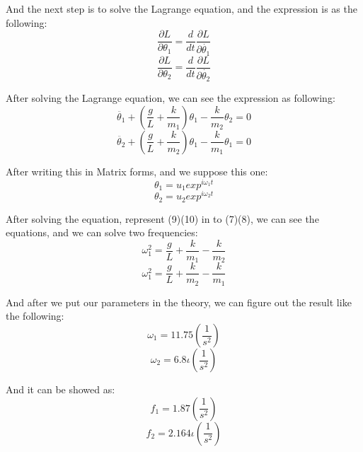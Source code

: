 \documentclass[final,1p,11pt]{elsarticle}
\begin{document}
And the next step is to solve the Lagrange equation, and the expression is as the following:
\begin{equation}
\frac{\partial L}{\partial \theta_1}=\frac{d}{dt}\frac{\partial L}{\partial \dot{\theta_1}}
\end{equation}
\begin{equation}
\frac{\partial L}{\partial \theta_2}=\frac{d}{dt}\frac{\partial L}{\partial \dot{\theta_2}}
\end{equation}

After solving the Lagrange equation, we can see the expression as following:
\begin{equation}
\ddot{\theta_1}+(\frac{g}{L}+\frac{k}{m_1})\theta_1-\frac{k}{m_2}\theta_2=0
\end{equation}
\begin{equation}
\ddot{\theta_2}+(\frac{g}{L}+\frac{k}{m_2})\theta_1-\frac{k}{m_1}\theta_1=0
\end{equation}

After writing this in Matrix forms, and we suppose this one:
\begin{equation}
\theta_1=u_1exp^{i\omega_1t}
\end{equation}
\begin{equation}
\theta_2=u_2exp^{i\omega_2t}
\end{equation}

After solving the equation, represent (9)(10) in to (7)(8), we can see the equations, and we can solve two frequencies:
\begin{equation}
\omega_1^2=\frac{g}{L}+\frac{k}{m_1}-\frac{k}{m_2}
\end{equation}
\begin{equation}
\omega_1^2=\frac{g}{L}+\frac{k}{m_2}-\frac{k}{m_1}
\end{equation}

And after we put our parameters in the theory, we can figure out the result like the following:
\begin{equation}
\omega_1=11.75(\frac{1}{s^2})  
\end{equation}
\begin{equation}
\omega_2=6.8\iota(\frac{1}{s^2})  
\end{equation}

And it can be showed as:
\begin{equation}
f_1=1.87(\frac{1}{s^2}) 
\end{equation}
\begin{equation}
 f_2=2.164\iota(\frac{1}{s^2})
\end{equation}
\end{document}
